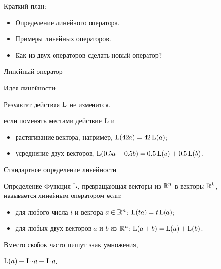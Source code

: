 

\begin{frame} %



\end{frame}


\begin{frame}{Краткий план:}

\begin{itemize}[<+->]
  \item Определение линейного оператора.
  \item Примеры линейных операторов.
  \item Как из двух операторов сделать новый оператор?
\end{itemize}

\end{frame}
    


\begin{frame}{Линейный оператор}


\alert{Идея линейности}:
  
Результат действия $\operatorname{L}$ не изменится, 

если поменять местами действие $\operatorname{L}$ и

\begin{itemize}[<+->]
    \item растягивание вектора, например, $\operatorname{L}(42a)=42\operatorname{L}(a)$;
    \item усреднение двух векторов, $\operatorname{L}(0.5a+0.5b)=0.5\operatorname{L}(a) + 0.5\operatorname{L}(b)$.
  \end{itemize}


\end{frame}


\begin{frame}{Стандартное определение линейности}

\begin{block}{Определение}
Функция $\operatorname{L}$, превращающая векторы из $\mathbb{R}^n$ в векторы $\mathbb{R}^k$, называется 
\alert{линейным оператором} если:

\begin{itemize}[<+->]
  \item для любого числа $t$ и вектора $a \in \mathbb{R}^n$: $\operatorname{L}(t a) = t\operatorname{L}(a)$;
  \item для любых двух векторов $a$ и $b$ из $\mathbb{R}^n$: $\operatorname{L}(a + b) = \operatorname{L}(a) + \operatorname{L}(b)$. 
\end{itemize}
\end{block}

\pause
\vspace{10pt}
Вместо скобок часто пишут знак умножения, 

$\operatorname{L}(a) \equiv \operatorname{L} \cdot a \equiv \operatorname{L} a$.

\end{frame}


